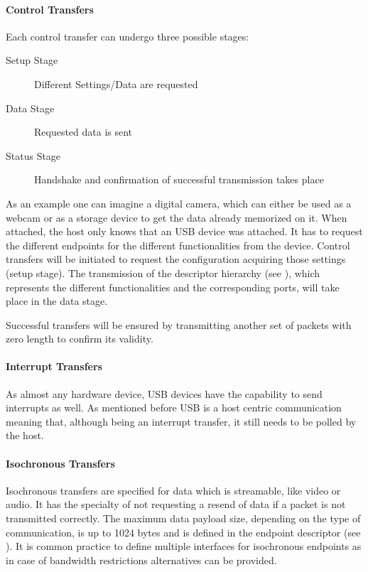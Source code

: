 \paragraph{Control Transfers}

Each control transfer can undergo three possible stages: 

\begin{description}
 \item[Setup Stage] Different Settings/Data are requested
 \item[Data Stage] Requested data is sent
 \item[Status Stage] Handshake and confirmation of successful transmission takes place
\end{description}

As an example one can imagine a digital camera, which can either be used as a webcam or as a storage device to get the data already 
memorized on it. When attached, the host only knows that an USB device was attached. It has to request the different endpoints for the 
different functionalities from the device. Control transfers will be initiated to request the configuration acquiring those settings 
(setup stage). The transmission of the descriptor hierarchy (see ), which represents the different functionalities and the 
corresponding ports, will take place in the data stage.

Successful transfers will be ensured by transmitting another set of packets with zero length to confirm its validity.

\paragraph{Interrupt Transfers}

As almost any hardware device, USB devices have the capability to send interrupts as well. As mentioned before USB is a host centric communication 
meaning that, although being an interrupt transfer, it still needs to be polled by the host. 

\paragraph{Isochronous Transfers}

Isochronous transfers are specified for data which is streamable, like video or audio. It has the specialty of not requesting a resend of data if a 
packet is not transmitted correctly. The maximum data payload size, depending on the type of communication, is up to 1024 bytes and is defined in 
the endpoint descriptor (see ). It is common practice to define multiple interfaces for isochronous endpoints as in case of 
bandwidth restrictions alternatives can be provided.

